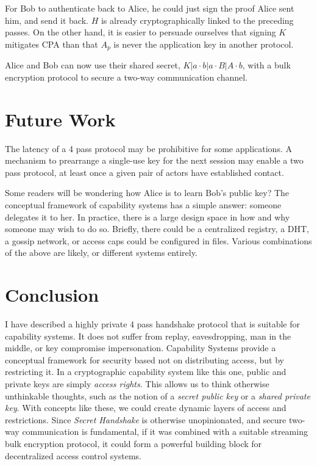 \documentclass[12pt]{article}
\begin{document}
For Bob to authenticate back to Alice, he could just sign the proof
Alice sent him, and send it back. $H$ is already cryptographically
linked to the preceding passes. On the other hand, it is easier to
persuade ourselves that signing $K$ mitigates CPA\cite{cpa} than that
$A_p$ is never the application key in another protocol.

Alice and Bob can now use their shared secret,
$K|a \cdot b|a \cdot B|A \cdot b$, with a bulk encryption protocol
to secure a two-way communication channel.

\section{Future Work}

The latency of a 4 pass protocol may be prohibitive for some
applications. A mechanism to prearrange a single-use
key for the next session may enable a two pass protocol, at least
once a given pair of actors have established contact.

Some readers will be wondering how Alice is to learn Bob's public key?
The conceptual framework of capability systems has a simple answer:
someone delegates it to her. In practice, there is a large design space
in how and why someone may wish to do so.
Briefly, there could be a centralized registry, a DHT, a gossip network,
or access caps could be configured in files. Various combinations of
the above are likely, or different systems entirely.

\section{Conclusion}

I have described a highly private 4 pass handshake protocol
that is suitable for capability systems. It does not suffer
from replay, eavesdropping, man in the middle,
or key compromise impersonation.
Capability Systems provide a conceptual framework for security
based not on distributing access, but by restricting it.
In a cryptographic capability system like this one, public and
private keys are simply \emph{access rights}. This allows us to
think otherwise unthinkable thoughts, such as the notion of a
\emph{secret public key} or a \emph{shared private key}.
With concepts like these, we could create dynamic
layers of access and restrictions. Since \emph{Secret Handshake} is
otherwise unopinionated, and secure two-way communication is fundamental,
if it was combined with a suitable streaming bulk encryption protocol,
it could form a powerful building block for decentralized access
control systems.




\end{document}
